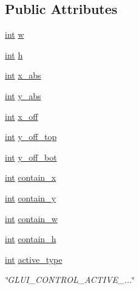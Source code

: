\subsection*{Public Attributes}
\begin{DoxyCompactItemize}
\item 
\hyperlink{wglext_8h_a500a82aecba06f4550f6849b8099ca21}{int} \hyperlink{class_g_l_u_i___control_aca82a099b9cbbadb188794cbfb06aa27}{w}
\item 
\hyperlink{wglext_8h_a500a82aecba06f4550f6849b8099ca21}{int} \hyperlink{class_g_l_u_i___control_a058c4f060b70952e6199f1409710ba0b}{h}
\item 
\hyperlink{wglext_8h_a500a82aecba06f4550f6849b8099ca21}{int} \hyperlink{class_g_l_u_i___control_a7f0f98737828ad255401f642826fbd7e}{x\+\_\+abs}
\item 
\hyperlink{wglext_8h_a500a82aecba06f4550f6849b8099ca21}{int} \hyperlink{class_g_l_u_i___control_a54a7a5a7c37e5c0e0a3154bac7ddb049}{y\+\_\+abs}
\item 
\hyperlink{wglext_8h_a500a82aecba06f4550f6849b8099ca21}{int} \hyperlink{class_g_l_u_i___control_a853d95e48b8bd6d2bdd41dabc2b1a1a6}{x\+\_\+off}
\item 
\hyperlink{wglext_8h_a500a82aecba06f4550f6849b8099ca21}{int} \hyperlink{class_g_l_u_i___control_a94fec9974356d3955e3a80e7d06926b9}{y\+\_\+off\+\_\+top}
\item 
\hyperlink{wglext_8h_a500a82aecba06f4550f6849b8099ca21}{int} \hyperlink{class_g_l_u_i___control_af4beca38aaf1aba7f5b4bfa3ccc8b909}{y\+\_\+off\+\_\+bot}
\item 
\hyperlink{wglext_8h_a500a82aecba06f4550f6849b8099ca21}{int} \hyperlink{class_g_l_u_i___control_aa02b20473b2d00e5b95bf36ff941e5bf}{contain\+\_\+x}
\item 
\hyperlink{wglext_8h_a500a82aecba06f4550f6849b8099ca21}{int} \hyperlink{class_g_l_u_i___control_a6327d4d71e9368bf238c6fddd958649e}{contain\+\_\+y}
\item 
\hyperlink{wglext_8h_a500a82aecba06f4550f6849b8099ca21}{int} \hyperlink{class_g_l_u_i___control_a9d54f7b7c867572debdad16b37867093}{contain\+\_\+w}
\item 
\hyperlink{wglext_8h_a500a82aecba06f4550f6849b8099ca21}{int} \hyperlink{class_g_l_u_i___control_afc9111c158e729b1e1630d4d9cd6ee1a}{contain\+\_\+h}
\item 
\hyperlink{wglext_8h_a500a82aecba06f4550f6849b8099ca21}{int} \hyperlink{class_g_l_u_i___control_ab9864db034526ddd5bbff94a5fb3ee9b}{active\+\_\+type}
\begin{DoxyCompactList}\small\item\em \char`\"{}\+G\+L\+U\+I\+\_\+\+C\+O\+N\+T\+R\+O\+L\+\_\+\+A\+C\+T\+I\+V\+E\+\_\+...\char`\"{} \end{DoxyCompactList}\item 

\end{DoxyCompactItemize}
